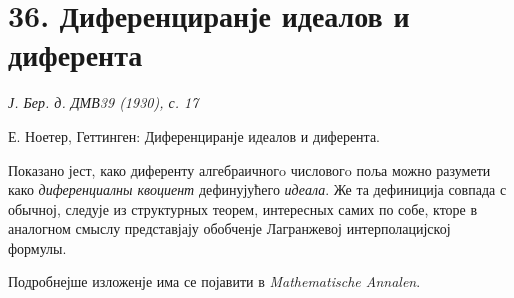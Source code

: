 \documentclass[11pt]{article}
\begin{document}
\section*{36. Диференциранје идеалов и диферента}

\begin{center}
\emph{Ј. Бер. д. ДМВ39 (1930), с. 17}
\end{center}

Е. Ноетер, Геттинген: Диференциранје идеалов и диферента.

Показано јест, како диференту алгебраичногo числовогo поља можно разумети како \emph{диференциалны квоциент} дефинујућего \emph{идеала}. Же та дефиниција совпада с обычној, следује из структурных теорем, интересных самих по собе, кторе в аналогном смыслу представјају обобченје Лагранжевој интерполацијској формулы.

Подробнејше изложенје има се појавити в \emph{Mathematische Annalen}.
\end{document}
